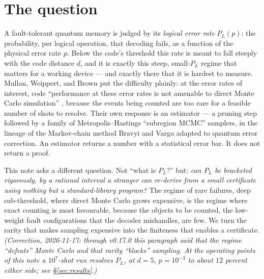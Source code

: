 \documentclass[11pt]{amsart}
\newcommand{\PL}{P_{L}}
\theoremstyle{plain}
\theoremstyle{definition}
\theoremstyle{remark}
\begin{document}
\maketitle

\section{The question}\label{sec:intro}

A fault-tolerant quantum memory is judged by its \emph{logical error rate}
$\PL(p)$: the probability, per logical operation, that decoding fails, as a
function of the physical error rate $p$. Below the code's threshold this rate
is meant to fall steeply with the code distance $d$, and it is exactly this
steep, small-$\PL$ regime that matters for a working device --- and exactly
there that it is hardest to measure. Mullan, Weippert, and Brown \cite{MWB}
put the difficulty plainly: at the error rates of interest, code
``performance at these error rates is not amenable to direct Monte Carlo
simulation'' \cite[abstract]{MWB}, because the events being counted are too
rare for a feasible number of shots to resolve. Their own response is an
estimator --- a pruning step followed by a family of Metropolis--Hastings
``subregion MCMC'' samplers, in the lineage of the Markov-chain method Bravyi
and Vargo \cite{BV} adapted to quantum error correction. An estimator returns a
number with a statistical error bar. It does not return a proof.

This note asks a different question. Not ``what is $\PL$?'' but: \emph{can
$\PL$ be bracketed rigorously, by a rational interval a stranger can re-derive
from a small certificate using nothing but a standard-library program?} The
regime of rare failures, deep sub-threshold, where direct Monte Carlo grows
expensive, is the regime where exact counting is most favourable, because the
objects to be counted, the low-weight fault configurations that the decoder
mishandles, are few. We turn the rarity that makes sampling expensive into the
finiteness that enables a certificate. \emph{(Correction, 2026-11-17: through
v0.17.0 this paragraph said that the regime ``defeats'' Monte Carlo and that
rarity ``blocks'' sampling. At the operating points of this note a
$10^7$-shot run resolves $\PL$, at $d=5$, $p=10^{-3}$ to about $12$ percent
either side; see \S\ref{sec:results}.)}
\end{document}
